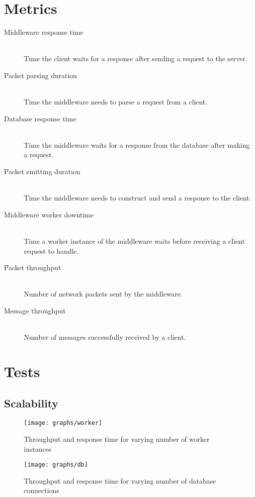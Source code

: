 \documentclass[a4paper, oneside]{csthesis}
\begin{document}
\section{Metrics}
	\begin{description}
		\item[Middleware response time] \ \\
		    Time the client waits for a response after sending a request to the server.
		\item[Packet parsing duration] \ \\
		    Time the middleware needs to parse a request from a client.
		\item[Database response time] \ \\
		    Time the middleware waits for a response from the database after making a request.
		\item[Packet emitting duration] \ \\
		    Time the middleware needs to construct and send a response to the client. 
		\item[Middleware worker downtime] \ \\
		    Time a worker instance of the middleware waits before receiving a client request to handle.
		\item[Packet throughput] \ \\
		    Number of network packets sent by the middleware.
		\item[Message throughput] \ \\
		    Number of messages successfully received by a client.
	\end{description}

\section{Tests}

\subsection{Scalability}
    \begin{figure}[ht]
    \centering
        \texttt{[image: graphs/worker]}
        \caption{Throughput and response time for varying number of worker instances}
        \label{fig:worker}
    \end{figure}
    
    \begin{figure}[ht]
    \centering
        \texttt{[image: graphs/db]}
        \caption{Throughput and response time for varying number of database connections}
        \label{fig:db}
    \end{figure}
\end{document}
